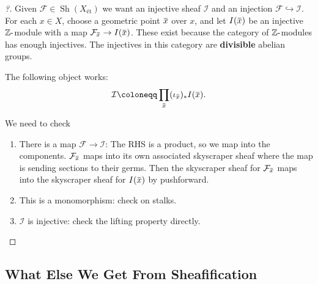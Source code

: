 \begin{proof}[?]

Given \(\mathcal{F}\in {\operatorname{Sh}}(X_\text{ét})\) we want an
injective sheaf \(\mathcal{I}\) and an injection
\(\mathcal{F}\hookrightarrow\mathcal{I}\). For each \(x\in X\), choose a
geometric point
\(\mkern 1.5mu\overline{\mkern-1.5mux\mkern-1.5mu}\mkern 1.5mu\) over
\(x\), and let
\(I(\mkern 1.5mu\overline{\mkern-1.5mux\mkern-1.5mu}\mkern 1.5mu)\) be
an injective \({\mathbb{Z}}{\hbox{-}}\)module with a map
\(\mathcal{F}_{\mkern 1.5mu\overline{\mkern-1.5mux\mkern-1.5mu}\mkern 1.5mu} \to I(\mkern 1.5mu\overline{\mkern-1.5mux\mkern-1.5mu}\mkern 1.5mu)\).
These exist because the category of \({\mathbb{Z}}{\hbox{-}}\)modules
has enough injectives. The injectives in this category are
\textbf{divisible} abelian groups.

\begin{claim}

The following object works:
\begin{align*}  
\mathcal{I} \coloneqq\prod_{\mkern 1.5mu\overline{\mkern-1.5mux\mkern-1.5mu}\mkern 1.5mu} (\iota_{\mkern 1.5mu\overline{\mkern-1.5mux\mkern-1.5mu}\mkern 1.5mu})_* I(\mkern 1.5mu\overline{\mkern-1.5mux\mkern-1.5mu}\mkern 1.5mu)
.\end{align*}

\end{claim}

We need to check

\begin{enumerate}
\def\labelenumi{\arabic{enumi}.}
\item
  There is a map \(\mathcal{F}\to \mathcal{I}\): The RHS is a product,
  so we map into the components.
  \(\mathcal{F}_{\mkern 1.5mu\overline{\mkern-1.5mux\mkern-1.5mu}\mkern 1.5mu}\)
  maps into its own associated skyscraper sheaf where the map is sending
  sections to their germs. Then the skyscraper sheaf for
  \(\mathcal{F}_{\mkern 1.5mu\overline{\mkern-1.5mux\mkern-1.5mu}\mkern 1.5mu}\)
  maps into the skyscraper sheaf for
  \(I(\mkern 1.5mu\overline{\mkern-1.5mux\mkern-1.5mu}\mkern 1.5mu)\) by
  pushforward.
\item
  This is a monomorphism: check on stalks.
\item
  \(\mathcal{I}\) is injective: check the lifting property directly.
\end{enumerate}

\end{proof}

\hypertarget{what-else-we-get-from-sheafification}{%
\subsection{What Else We Get From
Sheafification}\label{what-else-we-get-from-sheafification}}

